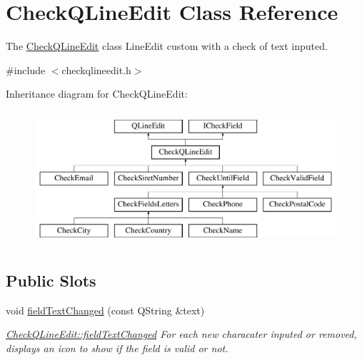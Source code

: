 \hypertarget{classCheckQLineEdit}{\section{Check\-Q\-Line\-Edit Class Reference}
\label{classCheckQLineEdit}
}


The \hyperlink{classCheckQLineEdit}{Check\-Q\-Line\-Edit} class Line\-Edit custom with a check of text inputed.  




{\ttfamily \#include $<$checkqlineedit.\-h$>$}

Inheritance diagram for Check\-Q\-Line\-Edit\-:\begin{figure}[H]
\begin{center}
\leavevmode
\includegraphics[height=5.000000cm]{d1/da9/classCheckQLineEdit}
\end{center}
\end{figure}
\subsection*{Public Slots}
\begin{DoxyCompactItemize}
\item 
\hypertarget{classCheckQLineEdit_a137569359307e1b17449af3a72c5e80e}{void \hyperlink{classCheckQLineEdit_a137569359307e1b17449af3a72c5e80e}{field\-Text\-Changed} (const Q\-String \&text)}\label{classCheckQLineEdit_a137569359307e1b17449af3a72c5e80e}

\begin{DoxyCompactList}\small\item\em \hyperlink{classCheckQLineEdit_a137569359307e1b17449af3a72c5e80e}{Check\-Q\-Line\-Edit\-::field\-Text\-Changed} For each new characater inputed or removed, displays an icon to show if the field is valid or not. \end{DoxyCompactList}\end{DoxyCompactItemize}
